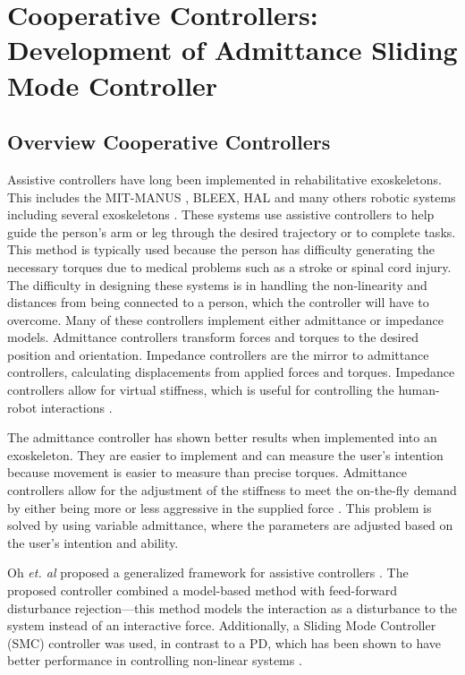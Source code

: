 \section{Cooperative Controllers: Development of Admittance Sliding Mode Controller}


\subsection{Overview Cooperative Controllers}
Assistive controllers have long been implemented in rehabilitative exoskeletons. This includes the MIT-MANUS \cite{ju2005rehabilitation}, BLEEX\cite{kazerooni2006hybrid}, HAL\cite{kawamoto2004power} and many others robotic systems including several exoskeletons \cite{kim2012admittance,ott2010unified,huo2011control}. These systems use assistive controllers to help guide the person's arm or leg through the desired trajectory or to complete tasks. This method is typically used because the person has difficulty generating the necessary torques due to medical problems such as a stroke or spinal cord injury. The difficulty in designing these systems is in handling the non-linearity and distances from being connected to a person, which the controller will have to overcome. Many of these controllers implement either admittance or impedance models. Admittance controllers transform forces and torques to the desired position and orientation. Impedance controllers are the mirror to admittance controllers, calculating displacements from applied forces and torques. Impedance controllers allow for virtual stiffness, which is useful for controlling the human-robot interactions \cite{keemink2018admittance}. 

The admittance controller has shown better results when implemented into an exoskeleton. They are easier to implement and can measure the user's intention because movement is easier to measure than precise torques. Admittance controllers allow for the adjustment of the stiffness to meet the on-the-fly demand by either being more or less aggressive in the supplied force \cite{aguirre2007active,newman1994stable}. This problem is solved by using variable admittance, where the parameters are adjusted based on the user's intention and ability.

Oh \textit{et. al} proposed a generalized framework for assistive controllers \cite{oh2015generalized}. The proposed controller combined a model-based method with feed-forward disturbance rejection—this method models the interaction as a disturbance to the system instead of an interactive force.  Additionally, a Sliding Mode Controller (SMC) controller was used, in contrast to a PD, which has been shown to have better performance in controlling non-linear systems \cite{slotine1991applied}.


